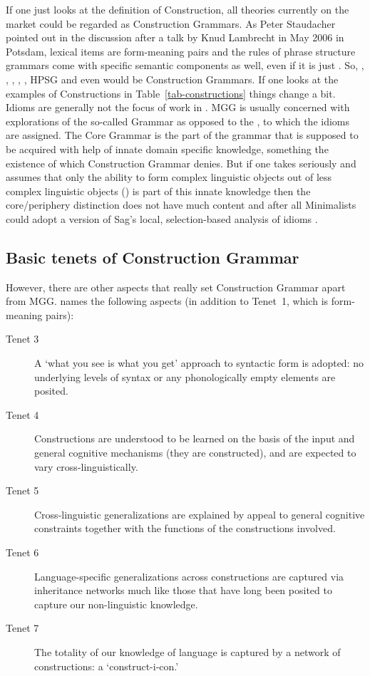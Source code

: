\documentclass[output=paper]{langsci/langscibook}
\begin{document}
If one just looks at the definition of Construction, all theories currently on the market could be
regarded as Construction Grammars. As Peter Staudacher pointed out in the discussion after a talk by
Knud Lambrecht in May 2006 in Potsdam, lexical items are form-meaning pairs and the rules of
phrase structure grammars come with specific semantic components as well, even if it is just
. So, \cg, , \gpsg, \treeag,
\lfg, HPSG and even \minimalism would be Construction Grammars. If one looks at the
examples of Constructions in Table~\ref{tab-constructions} things change a bit. Idioms are generally
not the focus of work in . MGG is usually concerned with
explorations of the so-called  Grammar as opposed to the , to which the
idioms are assigned. The Core Grammar is the part of the grammar that is supposed to be acquired with
help of innate domain specific knowledge, something the existence of which Construction Grammar
denies. But if one takes \citet*{HCF2002a} seriously and assumes that only the ability to form complex
linguistic objects out of less complex linguistic objects () is part of this innate knowledge
then the core/periphery distinction does not have much content and after all Minimalists could adopt
a version of Sag's local, selection-based analysis of idioms \parencites{Sag2007a}{KSF2015a}{KM2017a}.

\subsection{Basic tenets of Construction Grammar}

However, there are other aspects that really set Construction Grammar apart from
MGG. \citet{Goldberg2003b} names the following aspects (in addition to Tenet~1, which is
form-meaning pairs):
\begin{description}
\item[Tenet 3] A ‘what you see is what you get’ approach to syntactic form is adopted: no underlying levels
  of syntax or any phonologically empty elements are posited. 
\item[Tenet 4] Constructions are understood to be learned on the basis of the input and general cognitive mechanisms (they are constructed), and are expected to vary cross-linguistically.
\item[Tenet 5] Cross-linguistic generalizations are explained by appeal to general cognitive constraints together with the functions of the constructions involved.
\item[Tenet 6] Language-specific generalizations across constructions are captured via inheritance networks much like those that have long been posited to capture our non-linguistic knowledge.
\item[Tenet 7] The totality of our knowledge of language is captured by a network of constructions: a ‘construct-i-con.’
\end{description}
\end{document}
